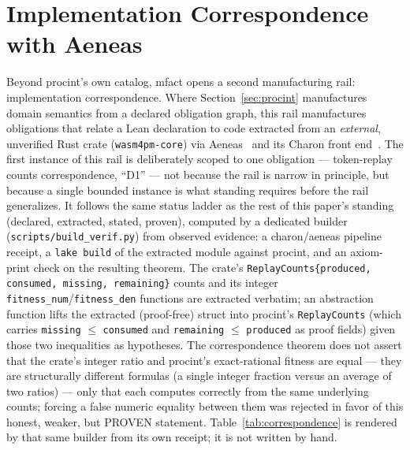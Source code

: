 \documentclass[11pt]{article}
\newif\ifreleasebuild
\begin{document}
\section{Implementation Correspondence with Aeneas}
\label{sec:correspondence}

Beyond \textsf{procint}'s own catalog, \textsf{mfact} opens a second
manufacturing rail: implementation correspondence. Where
Section~\ref{sec:procint} manufactures domain semantics from a declared
obligation graph, this rail manufactures obligations that relate a Lean
declaration to code extracted from an \emph{external}, unverified Rust
crate (\texttt{wasm4pm-core}) via Aeneas~\cite{ho2022aeneas} and its
Charon front end~\cite{protzenko2024charon}. The first instance of this
rail is deliberately scoped to one obligation --- token-replay counts
correspondence, ``D1'' --- not because the rail is narrow in principle,
but because a single bounded instance is what standing requires before the
rail generalizes. It follows the same status ladder as the rest of this
paper's standing (declared, extracted, stated, proven), computed by a
dedicated builder (\texttt{scripts/build\_verif.py}) from observed
evidence: a charon/aeneas pipeline receipt, a \texttt{lake build} of the
extracted module against \textsf{procint}, and an axiom-print check on the
resulting theorem. The
crate's \texttt{ReplayCounts}\allowbreak\texttt{\{produced, consumed,
missing, remaining\}} counts and its integer
\texttt{fitness\_num}/\texttt{fitness\_den} functions are extracted
verbatim; an abstraction function lifts the extracted (proof-free) struct
into \textsf{procint}'s \texttt{ReplayCounts} (which carries
\texttt{missing} $\le$ \texttt{consumed} and \texttt{remaining} $\le$
\texttt{produced} as proof fields) given those two inequalities as
hypotheses. The correspondence theorem does not assert that the crate's
integer ratio and \textsf{procint}'s exact-rational fitness are equal ---
they are structurally different formulas (a single integer fraction versus
an average of two ratios) --- only that each computes correctly from the
same underlying counts; forcing a false numeric equality between them was
rejected in favor of this honest, weaker, but PROVEN statement.
Table~\ref{tab:correspondence} is rendered by that same builder from its
own receipt; it is not written by hand.

\ifreleasebuild
  
\else
\fi
\end{document}
